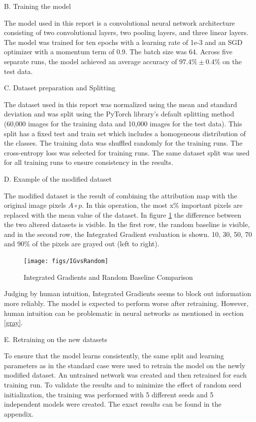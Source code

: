 B. Training the model

The model used in this report is a convolutional neural network architecture consisting of two convolutional layers, two pooling layers, and three linear layers. The model was trained for ten epochs with a learning rate of 1e-3 and an SGD optimizer with a momentum term of 0.9. The batch size was 64. Across five separate runs, the model achieved an average accuracy of $97.4\%\pm0.4\%$ on the test data.

C. Dataset preparation and Splitting

The dataset used in this report was normalized using the mean and standard deviation and was split using the PyTorch library's default splitting method (60,000 images for the training data and 10,000 images for the test data). This split has a fixed test and train set which includes a homogeneous distribution of the classes. The training data was shuffled randomly for the training runs. The cross-entropy loss was selected for training runs. The same dataset split was used for all training runs to ensure consistency in the results.

D. Example of the modified dataset

The modified dataset is the result of combining the attribution map with the original image pixels $A \circ p$. In this operation, the most x\% important pixels are replaced with the mean value of the dataset. In figure \ref{fig:IGvsRandom} the difference between the two altered datasets is visible. In the first row, the random baseline is visible, and in the second row, the Integrated Gradient evaluation is shown. 10, 30, 50, 70 and 90\% of the pixels are grayed out (left to right).

\begin{figure}[H]
	\centering
	\texttt{[image: figs/IGvsRandom]}
	\caption{Integrated Gradients and Random Baseline Comparison}
	\label{fig:IGvsRandom}
\end{figure}

Judging by human intuition, Integrated Gradients \cite{sundararajan2017axiomatic} seems to block out information more reliably. The model is expected to perform worse after retraining. However, human intuition can be problematic in neural networks as mentioned in section \ref{gray}.

E. Retraining on the new datasets

To ensure that the model learns consistently, the same split and learning parameters as in the standard case were used to retrain the model on the newly modified dataset. An untrained network was created and then retrained for each training run. To validate the results and to minimize the effect of random seed initialization, the training was performed with 5 different seeds and 5 independent models were created. The exact results can be found in the appendix.

